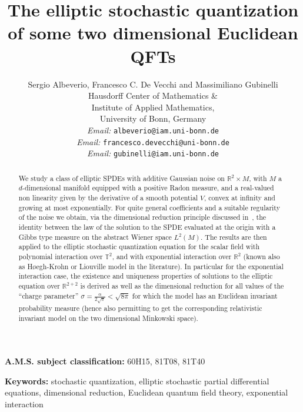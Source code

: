 \documentclass[a4paper,10pt]{article}
\newcommand{\tmaffiliation}[1]{\\ #1}
\newcommand{\tmemail}[1]{\\ \textit{Email:} \texttt{#1}}
\newcommand{\tmsep}{, }
\newcommand{\tmkeywords}{\textbf{Keywords:} }
\newcommand{\tmmsc}{\textbf{A.M.S. subject classification:} }
\begin{document}
\title{
  The elliptic stochastic quantization\\
  of some two dimensional Euclidean QFTs
}

\author{
  Sergio Albeverio, Francesco C. De Vecchi and Massimiliano Gubinelli
  \tmaffiliation{Hausdorff Center of Mathematics \&\\
  Institute of Applied Mathematics, \\
  University of Bonn, Germany}
  \tmemail{albeverio@iam.uni-bonn.de}
  \tmemail{francesco.devecchi@uni-bonn.de}
  \tmemail{gubinelli@iam.uni-bonn.de}
}

\date{}

\maketitle

\begin{abstract}
  We study a class of elliptic SPDEs with additive Gaussian noise on
  $\mathbb{R}^2 \times M$, with $M$ a $d$-dimensional manifold equipped with a
  positive Radon measure, and a real-valued non linearity given by the
  derivative of a smooth potential $V$, convex at infinity and growing at most
  exponentially. For quite general coefficients and a suitable regularity of
  the noise we obtain, via the dimensional reduction principle discussed
  in~{\cite{Albeverio2018elliptic}}, the identity between the law of the
  solution to the SPDE evaluated at the origin with a Gibbs type measure on
  the abstract Wiener space $L^2 (M)$. The results are then applied to the
  elliptic stochastic quantization equation for the scalar field with
  polynomial interaction over $\mathbb{T}^2$, and with exponential interaction
  over $\mathbb{R}^2$ (known also as H{\o}egh-Krohn or Liouville model in the
  literature). In particular for the exponential interaction case, the
  existence and uniqueness properties of solutions to the elliptic equation
  over $\mathbb{R}^{2 + 2}$ is derived as well as the dimensional reduction
  for all values of the ``charge parameter'' $\sigma = \frac{\alpha}{2
  \sqrt{\pi}} < \sqrt{8 \pi}$ for which the model has an Euclidean invariant
  probability measure (hence also permitting to get the corresponding
  relativistic invariant model on the two dimensional Minkowski space).
\end{abstract}

\tmmsc{60H15}{\tmsep}{81T08}{\tmsep}{81T40}

\tmkeywords{stochastic quantization}{\tmsep}{elliptic stochastic partial
differential equations}{\tmsep}{dimensional reduction}{\tmsep}{Euclidean
quantum field theory}{\tmsep}{exponential interaction}
\end{document}
